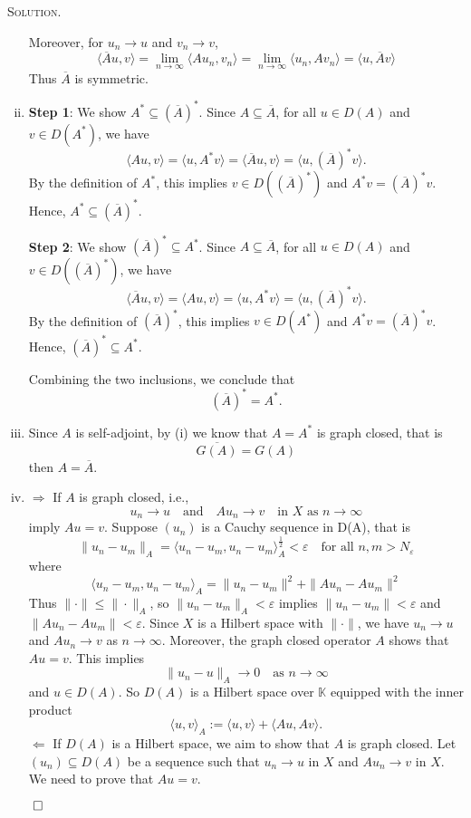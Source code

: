 \documentclass[12pt, a4paper, oneside]{ctexart}
\newenvironment{solution}{%
	\par\noindent\textsc{Solution. }\ignorespaces
}{%
	\hfill$\qed$\par
}
\begin{document}
\begin{solution}
\begin{enumerate}[(i)]
			Moreover, for $u_{n}\to u$ and $v_{n}\to v$,\[ \langle \overline{A}u, v\rangle = \lim\limits_{n\to\infty}\langle Au_{n},v_{n}\rangle = \lim\limits_{n\to\infty}\langle u_{n}, Av_{n}\rangle = \langle u, \overline{A}v\rangle  \]Thus $\overline{A}$ is symmetric.
			\item \textbf{Step 1}: We show \( A^* \subseteq (\overline{A})^* \). Since \( A \subseteq \overline{A} \), for all \( u \in D(A) \) and \( v \in D(A^*) \), we have
			\[
			\langle Au, v \rangle = \langle u, A^{*}v \rangle = \langle \overline{A}u, v \rangle = \langle u, (\overline{A})^*v \rangle.
			\]
			By the definition of \( A^* \), this implies \( v \in D((\overline{A})^*) \) and \( A^*v = (\overline{A})^*v \). Hence, \( A^* \subseteq (\overline{A})^* \).
			
			\textbf{Step 2}: We show \( (\overline{A})^* \subseteq A^* \). Since \( A \subseteq \overline{A} \), for all \( u \in D(A) \) and \( v \in D((\overline{A})^*) \), we have
			\[
			\langle \overline{A}u, v \rangle = \langle Au, v \rangle = \langle u, A^{*}v \rangle = \langle u, (\overline{A})^*v \rangle.
			\]
			By the definition of \( (\overline{A})^* \), this implies \( v \in D(A^*) \) and \( A^*v = (\overline{A})^*v \). Hence, \(  (\overline{A})^* \subseteq A^*\).
			
			
			Combining the two inclusions, we conclude that
			\[
			(\overline{A})^* = A^*.
			\]
			\item Since $A$ is self-adjoint, by (i) we know that $A = A^{*}$ is graph closed, that is \[ \overline{G(A)} = G(A) \] then $A = \overline{A}$.
			\item $\Rightarrow$ If $A$ is graph closed, i.e., \[
			u_n \to u \quad \text{and} \quad Au_n \to v \quad \text{in } X \text{ as } n \to \infty
			\]
			imply $Au = v$. Suppose  $(u_{n})$ is a Cauchy sequence in D(A), that is \[ \|u_{n}-u_{m}\|_{A} = \langle u_{n}-u_{m}, u_{n}-u_{m}\rangle^{\frac{1}{2}}_{A}<\varepsilon\quad\text{for all }n,m>N_{\varepsilon} \]where\[ \langle u_{n}-u_{m}, u_{n}-u_{m}\rangle_{A} = \|u_{n}-u_{m}\|^{2} + \|Au_{n}-Au_{m}\|^{2} \]Thus $\|\cdot\|\leq\|\cdot\|_{A}$, so $\|u_{n}-u_{m}\|_{A}<\varepsilon$ implies $\|u_{n}-u_{m}\|<\varepsilon$ and $\|Au_{n} - Au_{m}\|<\varepsilon$. Since $X$ is a Hilbert space with $\|\cdot\|$, we have $u_{n}\to u$ and $Au_{n}\to v$ as $n\to \infty$. Moreover, the graph closed operator $A$ shows that $Au = v$. This implies \[ \|u_{n} - u\|_{A}\to 0\quad\text{as } n\to\infty  \]and $u\in D(A)$. So $D(A)$ is a Hilbert space over $\mathbb{K}$ equipped with the inner  product\[
			\langle u , v\rangle_A := \langle u , v\rangle + \langle Au , Av\rangle.
			\]
			$\Leftarrow$ If $D(A)$ is a Hilbert space, we aim to show that $A$ is graph closed.
			Let \((u_n) \subseteq D(A)\) be a sequence such that \( u_n \to u \) in \( X \) and \( Au_n \to v \) in \( X \). We need to prove that \( Au = v \).
			

\end{enumerate}
\end{solution}
\end{document}
